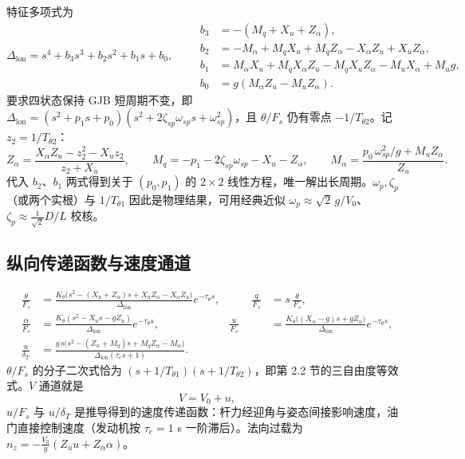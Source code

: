 \documentclass[UTF8,a4paper,11pt,fontset=fandol,scheme=plain]{ctexart}
\begin{document}
特征多项式为
\begin{equation}
\Delta_{\mathrm{lon}}=s^4+b_3s^3+b_2s^2+b_1s+b_0,\qquad
\begin{aligned}
b_3&=-(M_q+X_u+Z_\alpha),\\
b_2&=-M_\alpha+M_qX_u+M_qZ_\alpha-X_\alpha Z_u+X_uZ_\alpha,\\
b_1&=M_\alpha X_u+M_qX_\alpha Z_u-M_qX_uZ_\alpha-M_uX_\alpha+M_ug,\\
b_0&=g(M_\alpha Z_u-M_uZ_\alpha).
\end{aligned}
\end{equation}
要求四状态保持 GJB 短周期不变，即 \(\Delta_{\mathrm{lon}}=(s^2+p_1s+p_0)(s^2+2\zeta_{sp}\omega_{sp}s+\omega_{sp}^2)\)，且 \(\theta/F_s\) 仍有零点 \(-1/T_{\theta2}\)。记 \(z_2=1/T_{\theta2}\)：
\begin{equation}
Z_\alpha=\frac{X_\alpha Z_u-z_2^2-X_uz_2}{z_2+X_u},\qquad M_q=-p_1-2\zeta_{sp}\omega_{sp}-X_u-Z_\alpha,\qquad M_\alpha=\frac{p_0\,\omega_{sp}^2/g+M_uZ_\alpha}{Z_u}.
\end{equation}
代入 \(b_2\)、\(b_1\) 两式得到关于 \((p_0,p_1)\) 的 \(2\times2\) 线性方程，唯一解出长周期。\(\omega_p,\zeta_p\)（或两个实根）与 \(1/T_{\theta1}\) 因此是物理结果，可用经典近似 \(\omega_p\approx\sqrt2\,g/V_0\)、\(\zeta_p\approx\tfrac{1}{\sqrt2}D/L\) 校核。

\subsection{纵向传递函数与速度通道}
\begin{equation}
\begin{aligned}
\frac{\theta}{F_s}&=\frac{K_\theta\bigl(s^2-(X_u+Z_\alpha)s+X_uZ_\alpha-X_\alpha Z_u\bigr)}{\Delta_{\mathrm{lon}}}e^{-\tau_\theta s}, &\qquad \frac{q}{F_s}&=s\,\frac{\theta}{F_s},\\
\frac{\alpha}{F_s}&=\frac{K_\theta(s^2-X_us-gZ_u)}{\Delta_{\mathrm{lon}}}e^{-\tau_\theta s}, & \frac{u}{F_s}&=\frac{K_\theta\bigl((X_\alpha-g)s+gZ_\alpha\bigr)}{\Delta_{\mathrm{lon}}}e^{-\tau_\theta s},\\
\frac{u}{\delta_T}&=\frac{g\,s\bigl(s^2-(Z_\alpha+M_q)s+M_qZ_\alpha-M_\alpha\bigr)}{\Delta_{\mathrm{lon}}(\tau_es+1)}.
\end{aligned}
\end{equation}
\(\theta/F_s\) 的分子二次式恰为 \((s+1/T_{\theta1})(s+1/T_{\theta2})\)，即第 2.2 节的三自由度等效式。\(V\) 通道就是
\begin{equation}
V=V_0+u,
\end{equation}
\(u/F_s\) 与 \(u/\delta_T\) 是推导得到的速度传递函数：杆力经迎角与姿态间接影响速度，油门直接控制速度（发动机按 \(\tau_e=1\) s 一阶滞后）。法向过载为 \(n_z=-\tfrac{V_0}{g}(Z_uu+Z_\alpha\alpha)\)。
\end{document}
